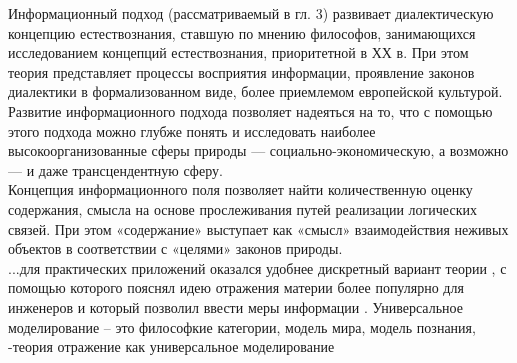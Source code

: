 \documentclass[a4paper,12pt]{report}
\begin{document}
Информационный подход (рассматриваемый в гл. 3) развивает диалектическую концепцию естествознания, ставшую по мнению философов, занимающихся исследованием концепций естествознания, приоритетной в ХХ в. При этом теория представляет процессы восприятия информации, проявление законов диалектики в формализованном виде, более приемлемом европейской культурой. Развитие информационного подхода позволяет надеяться на то, что с помощью этого подхода можно глубже понять и исследовать наиболее высокоорганизованные сферы природы — социально-экономическую, а возможно — и даже трансцендентную сферу.\\

Концепция информационного поля позволяет найти количественную оценку содержания, смысла на основе прослеживания путей реализации логических связей. При этом «содержание» выступает как «смысл» взаимодействия неживых объектов в соответствии с «целями» законов природы.\\
...для практических приложений оказался удобнее дискретный вариант теории , с помощью которого пояснял идею отражения материи более популярно для инженеров и который позволил ввести меры информации .
Универсальное моделирование – это философкие категории, модель мира, модель познания, -теория отражение как универсальное моделирование\\
\end{document}
